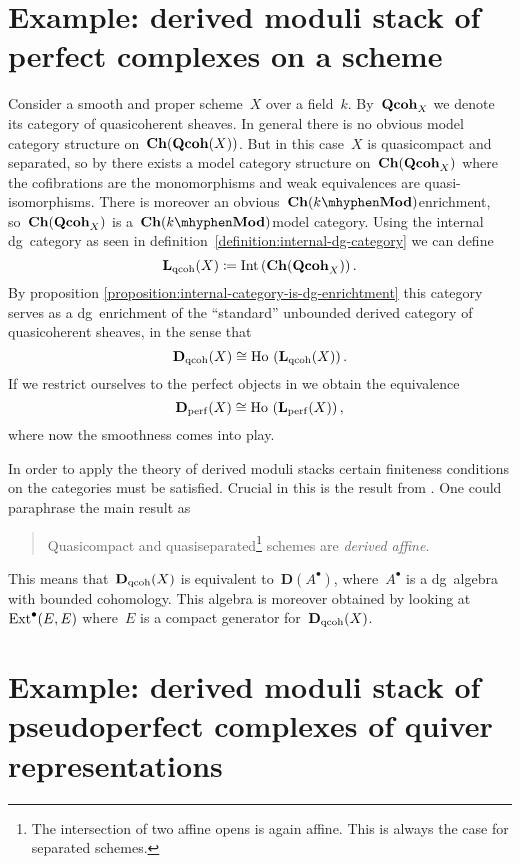\begin{refsection}
\section{Example: derived moduli stack of perfect complexes on a scheme}
Consider a smooth and proper scheme~$X$ over a field~$k$. By~$\mathbf{Qcoh}_X$ we denote its category of quasicoherent sheaves. In general there is no obvious model category structure on~$\mathbf{Ch}(\mathbf{Qcoh}(X))$. But in this case~$X$ is quasicompact and separated, so by \cite{hovey-sheaves} there exists a model category structure on~$\mathbf{Ch}(\mathbf{Qcoh}_X)$ where the cofibrations are the monomorphisms and weak equivalences are quasi-isomorphisms. There is moreover an obvious~$\Ch(k\mhyphen\Mod)$\dash enrichment, so~$\mathbf{Ch}(\mathbf{Qcoh}_X)$ is a~$\Ch(k\mhyphen\Mod)$\dash model category. Using the internal dg~category as seen in definition~\ref{definition:internal-dg-category} we can define
\begin{equation}
  \mathbf{L}_{\mathrm{qcoh}}(X)\coloneqq\operatorname{Int}\left( \mathbf{Ch}(\mathbf{Qcoh}_X) \right).
\end{equation}
By proposition \ref{proposition:internal-category-is-dg-enrichtment} this category serves as a dg~enrichment of the ``standard'' unbounded derived category of quasicoherent sheaves, in the sense that
\begin{equation}
  \mathbf{D}_{\mathrm{qcoh}}(X)\cong\operatorname{\mathrm{Ho} \,}\left( \mathbf{L}_{\mathrm{qcoh}}(X) \right).
\end{equation}
If we restrict ourselves to the perfect objects in we obtain the equivalence
\begin{equation}
  \mathbf{D}_{\mathrm{perf}}(X)\cong\operatorname{\mathrm{Ho} \,}\left( \mathbf{L}_{\mathrm{perf}}(X) \right),
\end{equation}
where now the smoothness comes into play.

In order to apply the theory of derived moduli stacks certain finiteness conditions on the categories must be satisfied. Crucial in this is the result from \cite{bondal-vandenbergh}. One could paraphrase the main result as
\begin{quote}
  Quasicompact and quasiseparated\footnote{The intersection of two affine opens is again affine. This is always the case for separated schemes.} schemes are \emph{derived affine}.
\end{quote}
\begin{flushright}
  \cite[corollary 3.1.8]{bondal-vandenbergh}
\end{flushright}
This means that~$\mathbf{D}_{\mathrm{qcoh}}(X)$ is equivalent to~$\mathbf{D}(A^\bullet)$, where~$A^\bullet$ is a dg~algebra with bounded cohomology. This algebra is moreover obtained by looking at~$\mathrm{Ext}^\bullet(E,E)$ where~$E$ is a compact generator for~$\mathbf{D}_{\mathrm{qcoh}}(X)$.

\section{Example: derived moduli stack of pseudoperfect complexes of quiver representations}

\printbibliography[heading = local]

\end{refsection}
